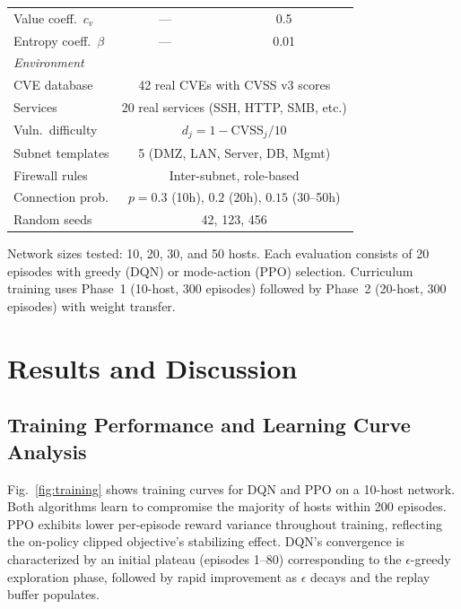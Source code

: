 \documentclass[conference]{IEEEtran}
\begin{document}
\begin{table}[h]
\begin{tabular}{lcc}
Value coeff.\ $c_v$ & ---           & 0.5 \\
Entropy coeff.\ $\beta$ & ---       & 0.01 \\
\midrule
\multicolumn{3}{l}{\textit{Environment}} \\
CVE database        & \multicolumn{2}{c}{42 real CVEs with CVSS v3 scores} \\
Services            & \multicolumn{2}{c}{20 real services (SSH, HTTP, SMB, etc.)} \\
Vuln.\ difficulty   & \multicolumn{2}{c}{$d_j = 1 - \text{CVSS}_j/10$} \\
Subnet templates    & \multicolumn{2}{c}{5 (DMZ, LAN, Server, DB, Mgmt)} \\
Firewall rules      & \multicolumn{2}{c}{Inter-subnet, role-based} \\
Connection prob.    & \multicolumn{2}{c}{$p=0.3$ (10h), $0.2$ (20h), $0.15$ (30--50h)} \\
Random seeds        & \multicolumn{2}{c}{42, 123, 456} \\
\bottomrule
\end{tabular}
\end{table}

Network sizes tested: 10, 20, 30, and 50 hosts.  Each evaluation
consists of 20 episodes with greedy (DQN) or mode-action (PPO) selection.
Curriculum training uses Phase~1 (10-host, 300 episodes) followed by
Phase~2 (20-host, 300 episodes) with weight transfer.

\section{Results and Discussion}
\label{sec:results}

\subsection{Training Performance and Learning Curve Analysis}
\label{sec:learningcurves}

Fig.~\ref{fig:training} shows training curves for DQN and PPO on a
10-host network.  Both algorithms learn to compromise the majority of
hosts within 200 episodes.  PPO exhibits lower per-episode reward
variance throughout training, reflecting the on-policy clipped objective's
stabilizing effect.  DQN's convergence is characterized by an initial
plateau (episodes 1--80) corresponding to the $\epsilon$-greedy
exploration phase, followed by rapid improvement as $\epsilon$ decays
and the replay buffer populates.
\end{document}
